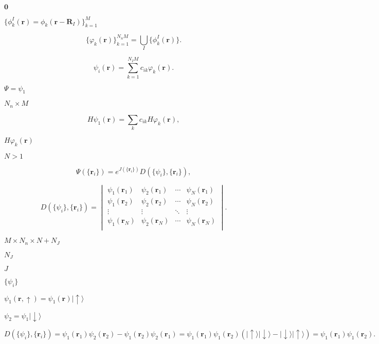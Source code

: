 \documentclass{article}
\begin{document}
$ \textbf{0} $
\pagebreak

$ \{\phi_k^I(\textbf{r})=\phi_k(\textbf{r}-\textbf{R}_I)\}_{k=1}^{M} $
\pagebreak

\begin{equation}\{\varphi_k(\textbf{r})\}_{k=1}^{N_nM} = \bigcup_I\{\phi_k^I(\textbf{r})\}. \end{equation}
\pagebreak

\begin{equation} \psi_i(\textbf{r})=\sum_{k=1}^{N_IM}c_{ik}\varphi_k(\textbf{r}). \end{equation}
\pagebreak

$ \Psi=\psi_1 $
\pagebreak

$N_n\times M $
\pagebreak

\begin{equation} H\psi_1(\textbf{r})=\sum_kc_{ik}H\varphi_k(\textbf{r}),\end{equation}
\pagebreak

$H\varphi_k(\textbf{r})$
\pagebreak

$N > 1$
\pagebreak

\begin{equation} \Psi(\{\textbf{r}_i\})=e^{J(\{\textbf{r}_i\})}D(\{\psi_i\},\{\textbf{r}_i\}), \end{equation}
\pagebreak

\begin{equation} D(\{\psi_i\},\{\textbf{r}_i\})=\begin{vmatrix} \psi_1(\textbf{r}_1) &\psi_2(\textbf{r}_1) &\cdots& \psi_N(\textbf{r}_1) \\ \psi_1(\textbf{r}_2) &\psi_2(\textbf{r}_2) &\cdots& \psi_N(\textbf{r}_2) \\ \vdots &\vdots &\ddots&\vdots \\ \psi_1(\textbf{r}_N) &\psi_2(\textbf{r}_N) &\cdots& \psi_N(\textbf{r}_N) \\ \end{vmatrix}. \end{equation}
\pagebreak

$M\times N_n\times N+N_J$
\pagebreak

$ N_J $
\pagebreak

$J$
\pagebreak

$\{\psi_i\}$
\pagebreak

$\psi_1(\textbf{r},\uparrow)=\psi_1(\textbf{r})|{\uparrow}\rangle$
\pagebreak

$\psi_2=\psi_1|{\downarrow}\rangle $
\pagebreak

\begin{equation} D(\{\psi_i\},\{\textbf{r}_i\})=\psi_1(\textbf{r}_1)\psi_2(\textbf{r}_2)-\psi_1(\textbf{r}_2)\psi_2(\textbf{r}_1)=\psi_1(\textbf{r}_1)\psi_1(\textbf{r}_2)(|{\uparrow}\rangle|{\downarrow}\rangle-|{\downarrow}\rangle|{\uparrow}\rangle)=\psi_1(\textbf{r}_1)\psi_1(\textbf{r}_2).\end{equation}
\pagebreak
\end{document}
